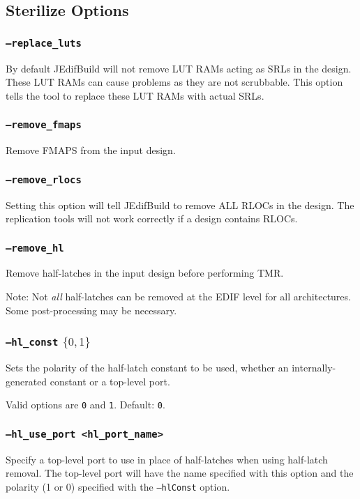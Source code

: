 \subsection{Sterilize Options}

\subsubsection{\texttt{--replace\_luts}}
By default JEdifBuild will not remove LUT RAMs acting as SRLs in the design.  These
LUT RAMs can cause problems as they are not scrubbable.  This option tells the 
tool to replace these LUT RAMs with actual SRLs.

\subsubsection{\texttt{--remove\_fmaps}}
Remove FMAPS from the input design.

\subsubsection{\texttt{--remove\_rlocs}}
Setting this option will tell JEdifBuild to remove ALL RLOCs in the design.
The replication tools will not work correctly if a design contains RLOCs.

\subsubsection{\texttt{--remove\_hl}}
Remove half-latches in the input design before performing TMR.

Note: Not \emph{all} half-latches can be removed at the EDIF 
level for all architectures. Some post-processing may be necessary.

\subsubsection{\texttt{--hl\_const} $\{0,1\}$}
Sets the polarity of the half-latch constant to be used, whether an 
internally-generated constant or a top-level port. 

Valid options are \texttt{0} and \texttt{1}. Default: \texttt{0}.

\subsubsection{\texttt{--hl\_use\_port <hl\_port\_name>}}
Specify a top-level port to use in place of half-latches when 
using half-latch removal. The top-level port will have the name specified with 
this option and the polarity (1 or 0) specified with the \texttt{--hlConst} 
option.

